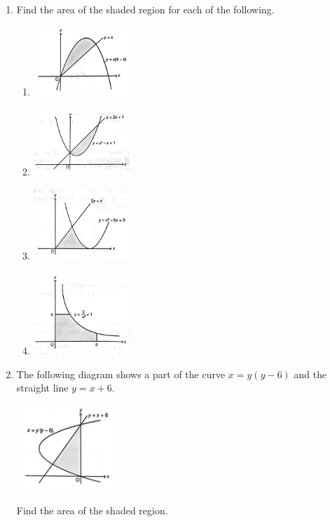 \documentclass{report}
\begin{document}
\begin{multicols*}{2}
\begin{enumerate}
            \item Find the area of the shaded region for each of the following.
                  \begin{enumerate}
                        \item \includegraphics[width=0.3\textwidth,valign=t]{./images/9.png}
                        \item \includegraphics[width=0.3\textwidth,valign=t]{./images/10.png}
                        \item \includegraphics[width=0.3\textwidth,valign=t]{./images/11.png}
                        \item \includegraphics[width=0.3\textwidth,valign=t]{./images/12.png}
                  \end{enumerate}

            \item The following diagram shows a part of the curve $x = y(y-6)$ and the straight
                  line $y = x+6$.
                  \begin{center}
                        \includegraphics[width=0.3\textwidth,valign=t]{./images/13.png}
                  \end{center}
                  Find the area of the shaded region.


\end{enumerate}
\end{multicols*}
\end{document}
